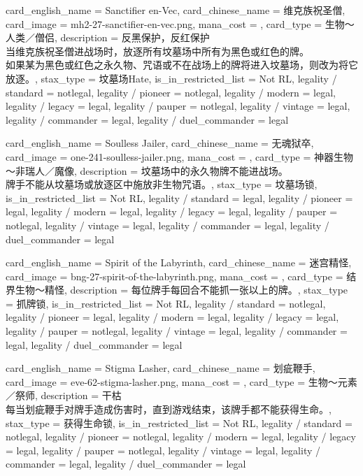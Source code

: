 \documentclass[lang = cn, color = black, 10pt]{AllThatStax}
\begin{document}
\card
{
	card_english_name = {Sanctifier en-Vec},
	card_chinese_name = {维克族祝圣僧},
	card_image = mh2-27-sanctifier-en-vec.png,
	mana_cost = ,
	card_type = 生物～人类／僧侣,
	description = {反黑保护，反红保护\\
当维克族祝圣僧进战场时，放逐所有坟墓场中所有为黑色或红色的牌。\\
如果某为黑色或红色之永久物、咒语或不在战场上的牌将进入坟墓场，则改为将它放逐。},
	stax_type = 坟墓场Hate,
	is_in_restricted_list = Not RL,
	legality / standard = notlegal,
	legality / pioneer = notlegal,
	legality / modern = legal,
	legality / legacy = legal,
	legality / pauper = notlegal,
	legality / vintage = legal,
	legality / commander = legal,
	legality / duel_commander = legal
}

\card
{
	card_english_name = {Soulless Jailer},
	card_chinese_name = {无魂狱卒},
	card_image = one-241-soulless-jailer.png,
	mana_cost = ,
	card_type = 神器生物～非瑞人／魔像,
	description = {坟墓场中的永久物牌不能进战场。\\
牌手不能从坟墓场或放逐区中施放非生物咒语。},
	stax_type = 坟墓场锁,
	is_in_restricted_list = Not RL,
	legality / standard = legal,
	legality / pioneer = legal,
	legality / modern = legal,
	legality / legacy = legal,
	legality / pauper = notlegal,
	legality / vintage = legal,
	legality / commander = legal,
	legality / duel_commander = legal
}

\card
{
	card_english_name = {Spirit of the Labyrinth},
	card_chinese_name = {迷宫精怪},
	card_image = bng-27-spirit-of-the-labyrinth.png,
	mana_cost = ,
	card_type = 结界生物～精怪,
	description = {每位牌手每回合不能抓一张以上的牌。},
	stax_type = 抓牌锁,
	is_in_restricted_list = Not RL,
	legality / standard = notlegal,
	legality / pioneer = legal,
	legality / modern = legal,
	legality / legacy = legal,
	legality / pauper = notlegal,
	legality / vintage = legal,
	legality / commander = legal,
	legality / duel_commander = legal
}

\card
{
	card_english_name = {Stigma Lasher},
	card_chinese_name = {划疵鞭手},
	card_image = eve-62-stigma-lasher.png,
	mana_cost = ,
	card_type = 生物～元素／祭师,
	description = {干枯\\
每当划疵鞭手对牌手造成伤害时，直到游戏结束，该牌手都不能获得生命。},
	stax_type = 获得生命锁,
	is_in_restricted_list = Not RL,
	legality / standard = notlegal,
	legality / pioneer = notlegal,
	legality / modern = legal,
	legality / legacy = legal,
	legality / pauper = notlegal,
	legality / vintage = legal,
	legality / commander = legal,
	legality / duel_commander = legal
}
\end{document}
